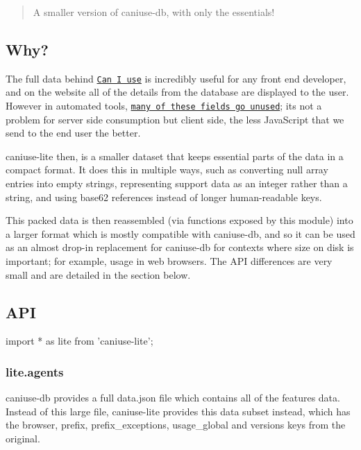 \begin{quote}
A smaller version of caniuse-\/db, with only the essentials! \end{quote}


\subsection*{Why?}

The full data behind \href{http://caniuse.com/}{\tt Can I use} is incredibly useful for any front end developer, and on the website all of the details from the database are displayed to the user. However in automated tools, \href{https://github.com/Fyrd/caniuse/issues/1827}{\tt many of these fields go unused}; it\textquotesingle{}s not a problem for server side consumption but client side, the less Java\+Script that we send to the end user the better.

caniuse-\/lite then, is a smaller dataset that keeps essential parts of the data in a compact format. It does this in multiple ways, such as converting {\ttfamily null} array entries into empty strings, representing support data as an integer rather than a string, and using base62 references instead of longer human-\/readable keys.

This packed data is then reassembled (via functions exposed by this module) into a larger format which is mostly compatible with caniuse-\/db, and so it can be used as an almost drop-\/in replacement for caniuse-\/db for contexts where size on disk is important; for example, usage in web browsers. The A\+PI differences are very small and are detailed in the section below.

\subsection*{A\+PI}


\begin{DoxyCode}
import * as lite from 'caniuse-lite';
\end{DoxyCode}


\subsubsection*{{\ttfamily lite.\+agents}}

caniuse-\/db provides a full {\ttfamily data.\+json} file which contains all of the features data. Instead of this large file, caniuse-\/lite provides this data subset instead, which has the {\ttfamily browser}, {\ttfamily prefix}, {\ttfamily prefix\+\_\+exceptions}, {\ttfamily usage\+\_\+global} and {\ttfamily versions} keys from the original.

